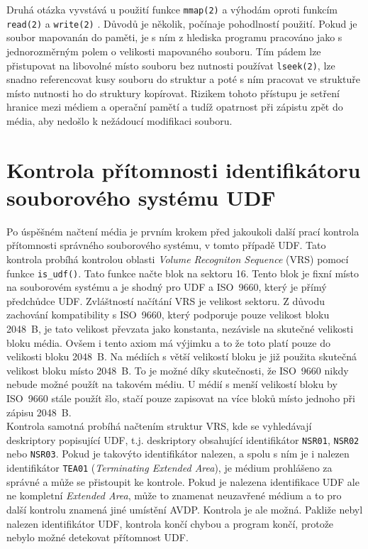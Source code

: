 Druhá otázka vyvstává u použití funkce \texttt{mmap(2)} a výhodám oproti funkcím \texttt{read(2)} \cite{man-read} a \texttt{write(2)} \cite{man-write}. Důvodů je několik, počínaje pohodlností použití. Pokud je soubor mapovanán do paměti, je s ním z hlediska programu pracováno jako s jednorozměrným polem o velikosti mapovaného souboru. Tím pádem lze přistupovat na libovolné místo souboru bez nutnosti používat \texttt{lseek(2)}, lze snadno referencovat kusy souboru do struktur a poté s ním pracovat ve struktuře místo nutnosti ho do struktury kopírovat. Rizikem tohoto přístupu je setření hranice mezi médiem a operační pamětí a tudíž opatrnost při zápistu zpět do média, aby nedošlo k nežádoucí modifikaci souboru.

\section{Kontrola přítomnosti identifikátoru souborového systému UDF}
\label{sec:kontrola-pritomonosti-udf}
Po úspěšném načtení média je prvním krokem před jakoukoli další prací kontrola přítomnosti správného souborového systému, v tomto případě UDF. Tato kontrola probíhá kontrolou oblasti \textit{Volume Recogniton Sequence} (VRS) pomocí funkce \texttt{is\_udf()}. Tato funkce načte blok na sektoru 16. Tento blok je fixní místo na souborovém systému a je shodný pro UDF a ISO~9660, který je přímý předchůdce UDF. Zvláštností načítání VRS je velikost sektoru. Z důvodu zachování kompatibility s ISO~9660, který podporuje pouze velikost bloku 2048~B, je tato velikost převzata jako konstanta, nezávisle na skutečné velikosti bloku média. Ovšem i tento axiom má výjimku a to že toto platí pouze do velikosti bloku 2048~B. Na médiích s větší velikostí bloku je již použita skutečná velikost bloku místo 2048~B. To je možné díky skutečnosti, že ISO~9660 nikdy nebude možné použít na takovém médiu. U médií s menší velikostí bloku by ISO~9660 stále použít šlo, stačí pouze zapisovat na více bloků místo jednoho při zápisu 2048~B.\\
Kontrola samotná probíhá načtením struktur VRS, kde se vyhledávají deskriptory popisující UDF, t.j. deskriptory obsahující identifikátor \texttt{NSR01}, \texttt{NSR02} nebo \texttt{NSR03}. Pokud je takovýto identifikátor nalezen, a spolu s ním je i nalezen identifikátor \texttt{TEA01} (\textit{Terminating Extended Area}), je médium prohlášeno za správné a může se přistoupit ke kontrole. Pokud je nalezena identifikace UDF ale ne kompletní \textit{Extended Area}, může to znamenat neuzavřené médium a to pro další kontrolu znamená jiné umístění AVDP. Kontrola je ale možná. Pakliže nebyl nalezen identifikátor UDF, kontrola končí chybou a program končí, protože nebylo možné detekovat přítomnost UDF.\\

